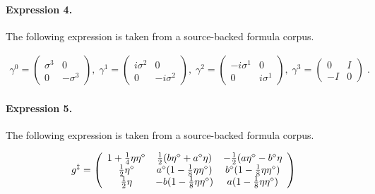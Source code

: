 \documentclass[11pt]{article}
\begin{document}
\paragraph{Expression 4.} The following expression is taken from a source-backed formula corpus.

\begin{align*}\gamma ^{0}=\left( \begin{array}{cc}\sigma ^{3} & 0 \\ 0 & -\sigma ^{3}\end{array}\right) ,\;\gamma ^{1}=\left( \begin{array}{cc}i\sigma ^{2} & 0 \\ 0 & -i\sigma ^{2}\end{array}\right) ,\;\gamma ^{2}=\left( \begin{array}{cc}-i\sigma ^{1} & 0 \\ 0 & i\sigma ^{1}\end{array}\right) ,\;\gamma ^{3}=\left( \begin{array}{cc}0 & I \\ -I & 0\end{array}\right) \;.\end{align*}

\paragraph{Expression 5.} The following expression is taken from a source-backed formula corpus.

\begin{align*}g^\ddag=\left(\begin{array}{ccc}1+{1\over 4}\eta\eta^\diamond&{1\over 2}(b\eta^\diamond+a^\diamond\eta)&-{1\over 2}(a\eta^\diamond-b^\diamond\eta\\{1\over 2}\eta^\diamond&a^\diamond(1-{1\over 8}\eta\eta^\diamond)&b^\diamond(1-{1\over 8}\eta\eta^\diamond)\\{1\over 2}\eta&-b(1-{1\over 8}\eta\eta^\diamond)& a(1-{1\over 8}\eta\eta^\diamond)\end{array}\right)\end{align*}
\end{document}
